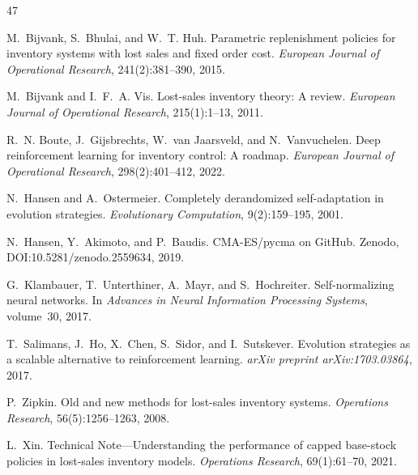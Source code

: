 \documentclass[11pt]{article}
\begin{document}
\begin{thebibliography}{47}

M.~Bijvank, S.~Bhulai, and W.~T. Huh.
Parametric replenishment policies for inventory systems with lost sales and fixed order cost.
\emph{European Journal of Operational Research}, 241(2):381--390, 2015.

M.~Bijvank and I.~F.~A. Vis.
Lost-sales inventory theory: A review.
\emph{European Journal of Operational Research}, 215(1):1--13, 2011.

R.~N. Boute, J.~Gijsbrechts, W.~van Jaarsveld, and N.~Vanvuchelen.
Deep reinforcement learning for inventory control: A roadmap.
\emph{European Journal of Operational Research}, 298(2):401--412, 2022.

N.~Hansen and A.~Ostermeier.
Completely derandomized self-adaptation in evolution strategies.
\emph{Evolutionary Computation}, 9(2):159--195, 2001.

N.~Hansen, Y.~Akimoto, and P.~Baudis.
CMA-ES/pycma on GitHub.
Zenodo, DOI:10.5281/zenodo.2559634, 2019.

G.~Klambauer, T.~Unterthiner, A.~Mayr, and S.~Hochreiter.
Self-normalizing neural networks.
In \emph{Advances in Neural Information Processing Systems}, volume~30, 2017.

T.~Salimans, J.~Ho, X.~Chen, S.~Sidor, and I.~Sutskever.
Evolution strategies as a scalable alternative to reinforcement learning.
\emph{arXiv preprint arXiv:1703.03864}, 2017.

P.~Zipkin.
Old and new methods for lost-sales inventory systems.
\emph{Operations Research}, 56(5):1256--1263, 2008.

L.~Xin.
Technical Note---Understanding the performance of capped base-stock policies in lost-sales inventory models.
\emph{Operations Research}, 69(1):61--70, 2021.


\end{thebibliography}
\end{document}

